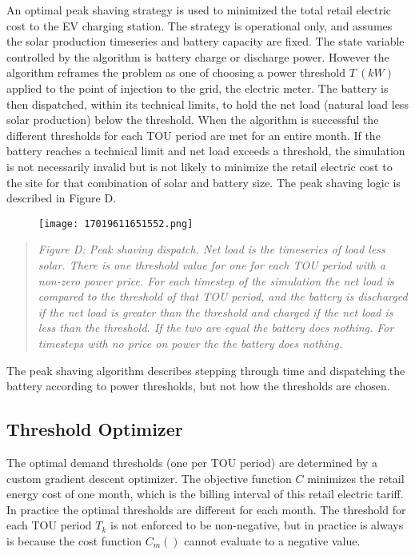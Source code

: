 \documentclass[
]{article}
\begin{document}
An optimal peak shaving strategy is used to minimized the total retail
electric cost to the EV charging station. The strategy is operational
only, and assumes the solar production timeseries and battery capacity
are fixed. The state variable controlled by the algorithm is battery
charge or discharge power. However the algorithm reframes the problem as
one of choosing a power threshold \(T\ (kW)\) applied to the point of
injection to the grid, the electric meter. The battery is then
dispatched, within its technical limits, to hold the net load (natural
load less solar production) below the threshold. When the algorithm is
successful the different thresholds for each TOU period are met for an
entire month. If the battery reaches a technical limit and net load
exceeds a threshold, the simulation is not necessarily invalid but is
not likely to minimize the retail electric cost to the site for that
combination of solar and battery size. The peak shaving logic is
described in Figure D.

\begin{figure}
\centering
\texttt{[image: 17019611651552.png]}
\caption{}
\end{figure}

\begin{quote}
\emph{Figure D: Peak shaving dispatch. Net load is the timeseries of
load less solar. There is one threshold value for one for each TOU
period with a non-zero power price. For each timestep of the simulation
the net load is compared to the threshold of that TOU period, and the
battery is discharged if the net load is greater than the threshold and
charged if the net load is less than the threshold. If the two are equal
the battery does nothing. For timesteps with no price on power the the
battery does nothing.}
\end{quote}

The peak shaving algorithm describes stepping through time and
dispatching the battery according to power thresholds, but not how the
thresholds are chosen.

\hypertarget{threshold-optimizer}{%
\subsection{Threshold Optimizer}\label{threshold-optimizer}}

The optimal demand thresholds (one per TOU period) are determined by a
custom gradient descent optimizer. The objective function \(C\)
minimizes the retail energy cost of one month, which is the billing
interval of this retail electric tariff. In practice the optimal
thresholds are different for each month. The threshold for each TOU
period \(T_k\) is not enforced to be non-negative, but in practice is
always is because the cost function \(C_m()\) cannot evaluate to a
negative value.
\end{document}
